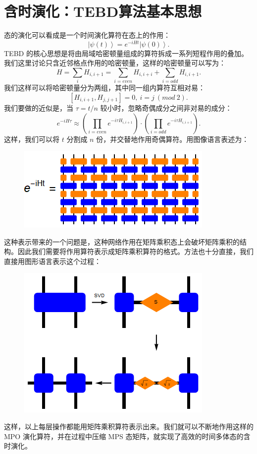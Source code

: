 \documentclass[UTF8]{ctexart}
\begin{document}
\section*{含时演化：TEBD算法基本思想}
态的演化可以看成是一个时间演化算符在态上的作用：
\begin{equation}
	\left|\psi\left(t\right)\right\rangle =e^{-iHt}\left|\psi\left(0\right)\right\rangle.
\end{equation}
TEBD 的核心思想是将由局域哈密顿量组成的算符拆成一系列短程作用的叠加。我们这里讨论只含近邻格点作用的哈密顿量，这样的哈密顿量可以写为：
\begin{equation}
	H=\sum_{i}H_{i,i+1}=\sum_{i=even}H_{i,i+i}+\sum_{i=odd}H_{i,i+1}.
\end{equation}
我们这样可以将哈密顿量分为两组，其中同一组内算符互相对易：
\begin{equation}
	\left[H_{i,i+1},H_{j,j+1}\right]=0,\ i=j\ \left(mod\ 2\right).
\end{equation}
我们要做的近似是，当 $\tau=t/n$  较小时，忽略奇偶成分之间非对易的成分：
\begin{equation}
	e^{-iH\tau}\approx\left(\prod_{i=even}e^{-i\tau H_{i,i+1}}\right)\cdot\left(\prod_{i=odd}e^{-i\tau H_{i,i+1}}\right).
\end{equation}
这样，我们可以将 $t$ 分割成 $n$ 份，并交替地作用奇偶算符。用图像语言表述为：
\begin{figure}[H]
\begin{centering}
\includegraphics[width=0.5\linewidth]{include/p16}
\par\end{centering}
\end{figure}
\noindent 这种表示带来的一个问题是，这种网络作用在矩阵乘积态上会破坏矩阵乘积的结构。因此我们需要将作用算符表示成矩阵乘积算符的格式。方法也十分直接，我们直接用图形语言表示这个过程：
\begin{figure}[H]
\begin{centering}
\includegraphics[width=0.4\linewidth]{include/p17}
\par\end{centering}
\end{figure}
\noindent 这样，以上每层操作都能用矩阵乘积算符表示出来。我们就可以不断地作用这样的 MPO 演化算符，并在过程中压缩 MPS 态矩阵，就实现了高效的时间多体态的含时演化。
\end{document}

